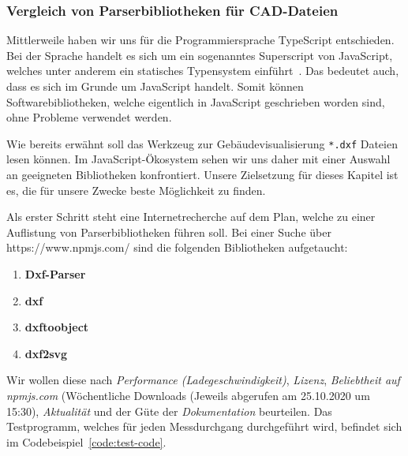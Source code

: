 \subsubsection{Vergleich von Parserbibliotheken für CAD-Dateien}
\label{subsubsec:comparison-parser-libs}

Mittlerweile haben wir uns für die Programmiersprache TypeScript entschieden.
Bei der Sprache handelt es sich um ein sogenanntes \glqq{}Superscript\grqq{} von JavaScript, welches unter anderem ein statisches Typensystem einführt~\cite{TypeScript}.
Das bedeutet auch, dass es sich im Grunde um JavaScript handelt.
Somit können Softwarebibliotheken, welche eigentlich in JavaScript geschrieben worden sind, ohne Probleme verwendet werden.

Wie bereits erwähnt soll das Werkzeug zur Gebäudevisualisierung \texttt{*.dxf} Dateien lesen können.
Im JavaScript-Ökosystem sehen wir uns daher mit einer Auswahl an geeigneten Bibliotheken konfrontiert.
Unsere Zielsetzung für dieses Kapitel ist es, die für unsere Zwecke beste Möglichkeit zu finden.

Als erster Schritt steht eine Internetrecherche auf dem Plan, welche zu einer Auflistung von Parserbibliotheken führen soll.
Bei einer Suche über https://www.npmjs.com/ sind die folgenden Bibliotheken aufgetaucht:

\begin{enumerate}
    \item \textbf{Dxf-Parser}~\cite{DxfParserNpm}
    \item \textbf{dxf}~\cite{DxfNpm}
    \item \textbf{dxftoobject}~\cite{dxftoobjectNpm}
    \item \textbf{dxf2svg}~\cite{dxf2svgNpm}
\end{enumerate}

Wir wollen diese nach \textit{Performance (Ladegeschwindigkeit)}, \textit{Lizenz}, \textit{Beliebtheit auf npmjs.com} (Wöchentliche Downloads (Jeweils abgerufen am 25.10.2020 um 15:30), \textit{Aktualität} und der Güte der \textit{Dokumentation} beurteilen.
Das Testprogramm, welches für jeden Messdurchgang durchgeführt wird, befindet sich im Codebeispiel~\ref{code:test-code}.

